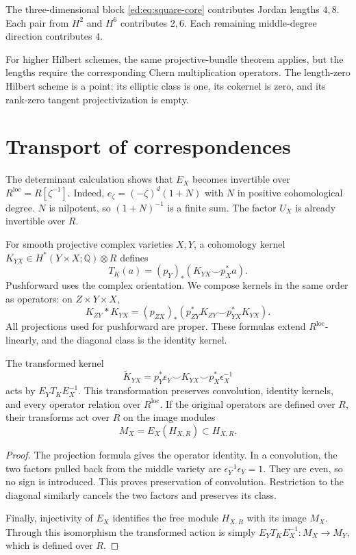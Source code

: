 The three-dimensional block \eqref{ed:eq:square-core} contributes
Jordan lengths $4,8$. Each pair from $H^2$ and $H^6$ contributes $2,6$.
Each remaining middle-degree direction contributes $4$.

For higher Hilbert schemes, the same projective-bundle theorem applies,
but the lengths require the corresponding Chern multiplication operators.
The length-zero Hilbert scheme is a point: its elliptic class is one,
its cokernel is zero, and its rank-zero tangent projectivization is empty.

\section{Transport of correspondences}
\label{ed:sec:transport}

The determinant calculation shows that $E_X$ becomes invertible over
$R^{\mathrm{loc}}=R[\zeta^{-1}]$. Indeed,
$e_\zeta=(-\zeta)^d(1+N)$ with $N$ in positive cohomological degree.
$N$ is nilpotent, so $(1+N)^{-1}$ is a finite sum. The factor $U_X$
is already invertible over $R$.

For smooth projective complex varieties $X,Y$, a cohomology kernel
$K_{YX}\in H^*(Y\times X;\mathbb Q)\otimes R$ defines
\[
 T_K(a)=(p_Y)_*(K_{YX}\smile p_X^*a).
\]
Pushforward uses the complex orientation. We compose kernels in the
same order as operators: on $Z\times Y\times X$,
\[
 K_{ZY}*K_{YX}
 =(p_{ZX})_*(p_{ZY}^*K_{ZY}\smile p_{YX}^*K_{YX}).
\]
All projections used for pushforward are proper. These formulas extend
$R^{\mathrm{loc}}$-linearly, and the diagonal class is the identity kernel.

\begin{proposition}\label{ed:prop:transport}
The transformed kernel
\begin{equation}\label{ed:eq:kernel}
 \widetilde K_{YX}
 =p_Y^*\epsilon_Y\smile K_{YX}\smile p_X^*\epsilon_X^{-1}
\end{equation}
acts by $E_YT_KE_X^{-1}$. This transformation preserves convolution,
identity kernels, and every operator relation over $R^{\mathrm{loc}}$.
If the original operators are defined over $R$, their transforms act
over $R$ on the image modules
\begin{equation}\label{ed:eq:image-module}
 M_X=E_X(H_{X,R})\subset H_{X,R}.
\end{equation}
\end{proposition}

\begin{proof}
The projection formula gives the operator identity. In a convolution,
the two factors pulled back from the middle variety are
$\epsilon_Y^{-1}\epsilon_Y=1$. They are even, so no sign is introduced.
This proves preservation of convolution. Restriction to the diagonal
similarly cancels the two factors and preserves its class.

Finally, injectivity of $E_X$ identifies the free module $H_{X,R}$
with its image $M_X$. Through this isomorphism the transformed action
is simply $E_YT_KE_X^{-1}:M_X\to M_Y$, which is defined over $R$.
\end{proof}

